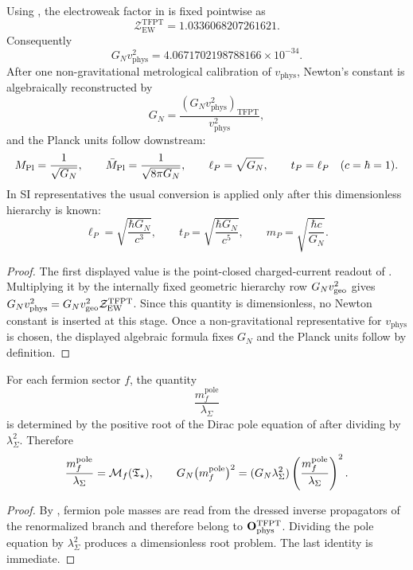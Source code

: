 \begin{corollary}
\label{cor:point-closed-planck-reconstruction}
Using , the electroweak factor in
 is fixed pointwise as
\[
\mathcal Z_{\mathrm{EW}}^{\mathrm{TFPT}}
=
1.0336068207261621.
\]
Consequently
\[
G_Nv_{\mathrm{phys}}^2
=
4.0671702198788166\times10^{-34}.
\]
After one non-gravitational metrological calibration of $v_{\mathrm{phys}}$, Newton's constant is
algebraically reconstructed by
\[
G_N=
\frac{(G_Nv_{\mathrm{phys}}^2)_{\mathrm{TFPT}}}{v_{\mathrm{phys}}^2},
\]
and the Planck units follow downstream:
\[
M_{\mathrm{Pl}}=\frac{1}{\sqrt{G_N}},
\qquad
\bar M_{\mathrm{Pl}}=\frac{1}{\sqrt{8\pi G_N}},
\qquad
\ell_P=\sqrt{G_N},
\qquad
t_P=\ell_P
\quad(c=\hbar=1).
\]
In SI representatives the usual conversion is applied only after this dimensionless hierarchy is
known:
\[
\ell_P=\sqrt{\frac{\hbar G_N}{c^3}},
\qquad
t_P=\sqrt{\frac{\hbar G_N}{c^5}},
\qquad
m_P=\sqrt{\frac{\hbar c}{G_N}}.
\]
\end{corollary}

\begin{proof}
The first displayed value is the point-closed charged-current readout of
. Multiplying it by the internally fixed geometric hierarchy
row $G_Nv_{\mathrm{geo}}^2$ gives $G_Nv_{\mathrm{phys}}^2=G_Nv_{\mathrm{geo}}^2\mathcal Z_{\mathrm{EW}}^{\mathrm{TFPT}}$.
Since this quantity is dimensionless, no Newton constant is inserted at this stage. Once a
non-gravitational representative for $v_{\mathrm{phys}}$ is chosen, the displayed algebraic formula
fixes $G_N$ and the Planck units follow by definition.
\end{proof}


\begin{theorem}
\label{thm:dimensionless-pole-mass-readout}
For each fermion sector $f$, the quantity
\[
\frac{m_f^{\mathrm{pole}}}{\lambda_\Sigma}
\]
is determined by the positive root of the Dirac pole equation of
 after dividing by $\lambda_\Sigma^2$. Therefore
\[
\frac{m_f^{\mathrm{pole}}}{\lambda_\Sigma}
=
\mathcal M_f(\mathfrak T_{\star}),
\qquad
G_N\bigl(m_f^{\mathrm{pole}}\bigr)^2
=
(G_N\lambda_\Sigma^2)\left(\frac{m_f^{\mathrm{pole}}}{\lambda_\Sigma}\right)^2.
\]
\end{theorem}

\begin{proof}
By , fermion pole masses are read from the dressed inverse propagators
of the renormalized branch and therefore belong to $\mathbf O_{\mathrm{phys}}^{\mathrm{TFPT}}$. Dividing the pole equation by
$\lambda_\Sigma^2$ produces a dimensionless root problem. The last identity is immediate.
\end{proof}

